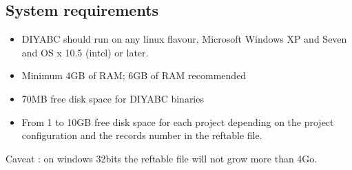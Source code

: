 \documentclass [a4paper]{report}
\let\subsectionv\subsection
\renewcommand{\subsection}[1]{\subsectionv{#1} \setcounter{paragraph}{0}}
\begin{document}
\subsection{System requirements}
\begin{itemize}
\item DIYABC should run on any linux flavour, Microsoft Windows XP and Seven and OS x 10.5 (intel) or later.
\item Minimum 4GB of RAM; 6GB of RAM recommended 
\item 70MB free disk space for DIYABC binaries
\item From 1 to 10GB free disk space for each project depending on the project configuration and the records number in the reftable file.
\end{itemize}

Caveat : on windows 32bits the reftable file will not grow more than 4Go.


\newpage




\end{document}
